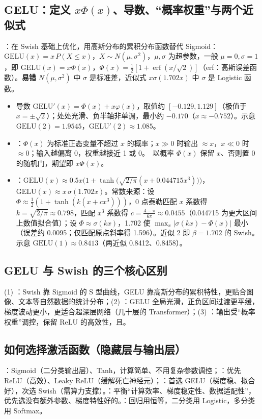 \subsection{GELU：定义 \texorpdfstring{$x\Phi(x)$}{x Phi(x)}、导数、“概率权重”与两个近似式}
：在 Swish 基础上优化，用高斯分布的累积分布函数替代 Sigmoid：$\mathrm{GELU}(x)=x\,P(X\le x)$，$X\sim N(\mu,\sigma^2)$，$\mu,\sigma$ 为超参数，一般 $\mu=0,\sigma=1$，即 $\mathrm{GELU}(x)=x\Phi(x)$，$\Phi(x)=\frac12[1+\operatorname{erf}(x/\sqrt2)]$（erf：高斯误差函数）。\textbf{易错} $N(\mu,\sigma^2)$ 中 $\sigma$ 是标准差，近似式 $x\sigma(1.702x)$ 中 $\sigma$ 是 Logistic 函数。
\begin{itemize}
\item 导数 $\mathrm{GELU}'(x)=\Phi(x)+x\varphi(x)$，取值约 $[-0.129,1.129]$（极值于 $x=\pm\sqrt2$）；处处光滑、负半轴非单调，最小约 $-0.170$（$x\approx-0.752$）。示意 $\mathrm{GELU}(2)=1.9545$，$\mathrm{GELU}'(2)\approx1.085$。
\item {}：$\Phi(x)$ 为标准正态变量不超过 $x$ 的概率；$x\gg0$ 时输出 $\approx x$，$x\ll0$ 时 $\approx0$；输入越偏离 0，权重越接近 1 或 0。\tagext\ 以概率 $\Phi(x)$ 保留 $x$、否则置 0 的随机门，期望即 $x\Phi(x)$。
\item {}：$\mathrm{GELU}(x)\approx0.5x\big(1+\tanh\big(\sqrt{2/\pi}(x+0.044715x^3)\big)\big)$，$\mathrm{GELU}(x)\approx x\,\sigma(1.702x)$。常数来源：设 $\Phi\approx\frac12(1+\tanh(k(x+cx^3)))$，0 点泰勒匹配 $x$ 系数得 $k=\sqrt{2/\pi}\approx0.798$，匹配 $x^3$ 系数得 $c=\frac{4-\pi}{6\pi}\approx0.0455$（0.044715 为更大区间上数值拟合值）；设 $\Phi\approx\sigma(kx)$，1.702 使 $\max_x|\sigma(kx)-\Phi(x)|$ 最小（误差约 0.0095；仅匹配原点斜率得 1.596）。近似 2 即 $\beta=1.702$ 的 Swish。示意 $\mathrm{GELU}(1)\approx0.8413$（两近似 0.8412、0.8458）。
\end{itemize}

\subsection{GELU 与 Swish 的三个核心区别}
(1) ：Swish 靠 Sigmoid 的 S 型曲线，GELU 靠高斯分布的累积特性，更贴合图像、文本等自然数据的统计分布；(2) ：GELU 全局光滑，正负区间过渡更平缓，梯度波动更小，更适合超深层网络（几十层的 Transformer）；(3) ：输出受“概率权重”调控，保留 ReLU 的高效性，且。

\subsection{如何选择激活函数（隐藏层与输出层）}
：Sigmoid（二分类输出层）、Tanh，计算简单、不用复杂参数调控；：优先 ReLU（高效）、Leaky ReLU（缓解死亡神经元）；：首选 GELU（梯度稳、拟合好），次选 Swish（需算力支撑）。：平衡“计算效率、梯度稳定性、数据适配性”，优先选没有额外参数、梯度特性好的。：回归用恒等，二分类用 Logistic，多分类用 Softmax。

